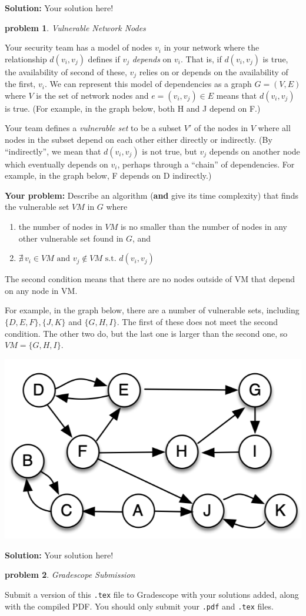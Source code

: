 \documentclass[10pt]{article}
\newcommand{\solution}[1]{\color{blue}\hfill\break\noindent\textbf{Solution:} #1\color{black}}
\newtheorem{problem}{\sc\color{cit}problem}
\begin{document}
\solution{
Your solution here!
}



\begin{problem}Vulnerable Network Nodes\end{problem}

Your security team has a model of nodes $v_i$ in your network where the relationship $d(v_i, v_j)$ defines if $v_j$ \emph{depends} on $v_i$. That is, if $d(v_i, v_j)$ is true,  the availability of second of these, $v_j$ relies on or depends on the availability of the first, $v_i$. We can represent this model of dependencies as a graph $G=(V,E)$ where $V$ is the set of network nodes and $e=(v_i, v_j) \in E$ means that $d(v_i, v_j)$ is true.  (For example, in the graph below, both H and J depend on F.)

Your team defines a \emph{vulnerable set} to be a subset $V'$ of the nodes in $V$ where all nodes in the subset depend on each other either directly or indirectly. (By ``indirectly'', we mean that $d(v_i, v_j)$ is not true, but $v_j$ depends on another node which eventually depends on $v_i$, perhaps through a ``chain'' of dependencies. For example, in the graph below, F depends on D indirectly.) 

\textbf{Your problem:}  Describe an algorithm (\textbf{and} give its time complexity) that finds the vulnerable set $VM$ in $G$ where 
\begin{enumerate}
\item the number of nodes in $VM$ is no smaller than the number of nodes in any other vulnerable set found in $G$, and
\item $\nexists \, v_i \in VM \textrm{ and } v_j \notin VM \textrm{ s.t. } d(v_i, v_j)$
\end{enumerate}
The second condition means that there are no nodes outside of VM that depend on any node in VM.

For example, in the graph below, there are a number of vulnerable sets, including $\{D, E, F\}, \{J, K\}$ and $\{G, H, I\}$.   The first of these does not meet the second condition. The other two do, but the last one is larger than the second one, so $VM=\{G, H, I\}$.

 
 \includegraphics[width = 0.4\columnwidth]{vulnerable-sets.png}

\solution{
Your solution here!
}


\begin{problem} Gradescope Submission \end{problem}
Submit a version of this \verb|.tex| file to Gradescope with your solutions added, along with the compiled PDF.  You should only submit your \verb|.pdf| and \verb|.tex| files.
\end{document}
